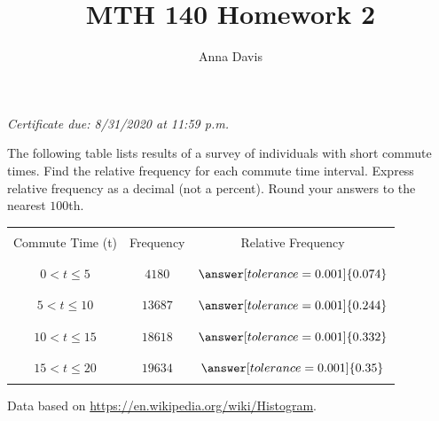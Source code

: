 \documentclass{ximera}
\author{Anna Davis} \title{MTH 140 Homework 2}
\begin{document}
\begin{abstract}

\end{abstract}
\maketitle
 \textit{Certificate due: 8/31/2020 at 11:59 p.m.}
\begin{problem}\label{prob:140hom2prob1}
The following table lists results of a survey of individuals with short commute times.
Find the relative frequency for each commute time interval.  Express relative frequency as a decimal (not a percent).  Round your answers to the nearest $100$th.
\begin{center}
\begin{tabular}{|c|c|c|}
 \hline
 &&   \\
 Commute Time (t)&Frequency& Relative Frequency \\
 &&   \\
  \hline
  &&  \\
 $0<t\leq 5$&$4180$&$\answer[tolerance=0.001]{0.074}$ \\
  && \\
 \hline
  && \\
 $5<t\leq 10$&$13687$&$\answer[tolerance=0.001]{0.244}$ \\
  && \\
 \hline
  && \\
  $10<t\leq 15$&$18618$&$\answer[tolerance=0.001]{0.332}$  \\
  && \\
 \hline
 && \\
  $15<t\leq 20$&$19634$&$\answer[tolerance=0.001]{0.35}$  \\
  && \\
 \hline
 \end{tabular}
\end{center}    
Data based on \href{https://en.wikipedia.org/wiki/Histogram}{https://en.wikipedia.org/wiki/Histogram}.
\end{problem}
\end{document}
